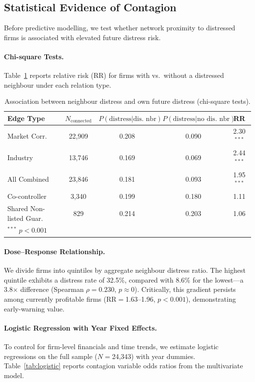 \documentclass[3p,times,procedia]{elsarticle}
\begin{document}
\subsection{Statistical Evidence of Contagion}
\label{subsec:stat_evidence}

Before predictive modelling, we test whether network proximity to distressed firms is associated with elevated future distress risk.

\paragraph{Chi-square Tests.}
Table~\ref{tab:contagion_chi2} reports relative risk (RR) for firms with vs.\ without a distressed neighbour under each relation type.

\begin{table}[htbp]
\centering
\caption{Association between neighbour distress and own future distress (chi-square tests).}\label{tab:contagion_chi2}
\begin{tabular}{@{}lcccc@{}}
\toprule
Edge Type & $N_{\text{connected}}$ & $P(\text{distress}|\text{dis. nbr})$ & $P(\text{distress}|\text{no dis. nbr})$ & RR \\
\midrule
Market Corr. & 22{,}909 & 0.208 & 0.090 & 2.30$^{***}$ \\
Industry & 13{,}746 & 0.169 & 0.069 & 2.44$^{***}$ \\
All Combined & 23{,}846 & 0.181 & 0.093 & 1.95$^{***}$ \\
Co-controller & 3{,}340 & 0.199 & 0.180 & 1.11 \\
Shared Non-listed Guar. & 829 & 0.214 & 0.203 & 1.06 \\
\bottomrule
\multicolumn{5}{l}{\footnotesize $^{***}$ $p<0.001$} \\
\end{tabular}
\end{table}

\paragraph{Dose--Response Relationship.}
We divide firms into quintiles by aggregate neighbour distress ratio.
The highest quintile exhibits a distress rate of 32.5\%, compared with 8.6\% for the lowest---a 3.8$\times$ difference (Spearman $\rho = 0.230$, $p \approx 0$).
Critically, this gradient persists among currently profitable firms (RR$=$1.63--1.96, $p<0.001$), demonstrating early-warning value.

\paragraph{Logistic Regression with Year Fixed Effects.}
To control for firm-level financials and time trends, we estimate logistic regressions on the full sample ($N=$24{,}343) with year dummies.
Table~\ref{tab:logistic} reports contagion variable odds ratios from the multivariate model.
\end{document}
